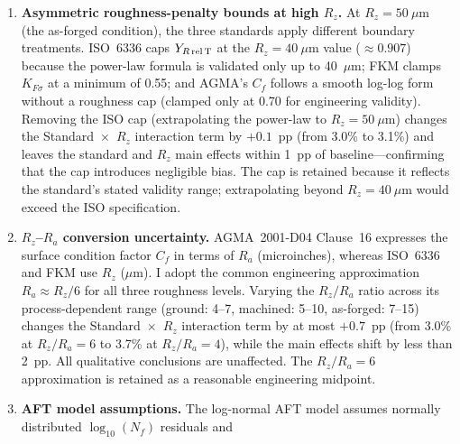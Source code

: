 \documentclass[12pt,a4paper]{article}
\begin{document}
\begin{enumerate}
        should therefore be interpreted as a \emph{lower bound} on the true
        between-standard divergence: re-instating each standard's full native
        stress-concentration treatment would likely increase, not decrease,
        the spread. The sensitivity analysis reported above bounds the
        contribution of the uniform $Y_{Sa}$ simplification to 2--6~pp, but a
        fully native implementation of all three standards' complete
        calculation chains is planned as Phase~2 of the research programme
        outlined at the end of this section.
  \item \textbf{Asymmetric roughness-penalty bounds at high $R_z$.} At
        $R_z = 50~\mu$m (the as-forged condition), the three standards
        apply different boundary treatments. ISO~6336 caps
        $Y_{R\,\rm rel\,T}$ at the $R_z = 40~\mu$m value
        ($\approx 0.907$) because the power-law formula is validated only
        up to 40~$\mu$m; FKM clamps $K_{F\sigma}$ at a minimum of 0.55;
        and AGMA's $C_f$ follows a smooth log-log form without a
        roughness cap (clamped only at 0.70 for engineering validity).
        Removing the ISO cap (extrapolating the power-law to
        $R_z=50~\mu$m) changes the Standard~$\times$~$R_z$ interaction
        term by $+0.1$~pp (from 3.0\% to 3.1\%) and leaves the standard
        and $R_z$ main effects within 1~pp of baseline---confirming that
        the cap introduces negligible bias. The cap is retained because
        it reflects the standard's stated validity range; extrapolating
        beyond $R_z = 40~\mu$m would exceed the ISO specification.
  \item \textbf{$R_z$--$R_a$ conversion uncertainty.} AGMA~2001-D04
        Clause~16 expresses the surface condition factor $C_f$ in terms
        of $R_a$ (microinches), whereas ISO~6336 and FKM use $R_z$
        ($\mu$m). I adopt the common engineering approximation
        $R_a \approx R_z/6$ for all three roughness levels. Varying the
        $R_z/R_a$ ratio across its process-dependent range (ground: 4--7,
        machined: 5--10, as-forged: 7--15) changes the
        Standard~$\times$~$R_z$ interaction term by at most $+0.7$~pp
        (from 3.0\% at $R_z/R_a=6$ to 3.7\% at $R_z/R_a=4$), while the
        main effects shift by less than 2~pp. All qualitative
        conclusions are unaffected. The $R_z/R_a=6$ approximation is
        retained as a reasonable engineering midpoint.
  \item \textbf{AFT model assumptions.} The log-normal AFT model
        assumes normally distributed $\log_{10}(N_f)$ residuals and

\end{enumerate}
\end{document}
